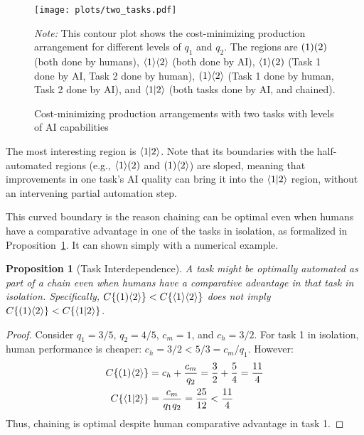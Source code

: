 \documentclass{article}
\theoremstyle{plain}
\theoremstyle{plain}
\newtheorem{proposition}[theorem]{Proposition}
\begin{document}
\begin{figure}
  \caption{Cost-minimizing production arrangements with two tasks with levels of AI capabilities} \label{fig:two_tasks}
  \begin{center}
  \texttt{[image: plots/two\_tasks.pdf]} \\
  \end{center}
\begin{footnotesize}
  \emph{Note:} This contour plot shows the cost-minimizing production arrangement for different levels of $q_1$ and $q_2$.
  The regions are $( 1 )( 2 )$ (both done by humans), $\langle 1 \rangle\langle 2 \rangle$ (both done by AI), $\langle 1 \rangle( 2 )$ (Task 1 done by AI, Task 2 done by human), $( 1 )\langle 2 \rangle$ (Task 1 done by human, Task 2 done by AI), and $\langle 1|2 \rangle$ (both tasks done by AI, and chained).
\end{footnotesize}
\end{figure}

The most interesting region is $\langle 1|2 \rangle$.
Note that its boundaries with the half-automated regions (e.g., $\langle 1 \rangle( 2 )$ and $( 1 )\langle 2 \rangle$) are sloped, meaning that improvements in one task's AI quality can bring it into the $\langle 1|2 \rangle$ region, without an intervening partial automation step.

This curved boundary is the reason chaining can be optimal even when humans have a comparative advantage in one of the tasks in isolation, as formalized in Proposition~\ref{proposition:interdependence}.
It can shown simply with a numerical example.

\begin{proposition}[Task Interdependence] \label{proposition:interdependence}
A task might be optimally automated as part of a chain even when humans have a comparative advantage in that task in isolation.
Specifically, $C\{ ( 1 )\langle 2 \rangle \} < C\{ \langle 1 \rangle\langle 2 \rangle \}$ does not imply $C\{ ( 1 )\langle 2 \rangle \} < C\{ \langle 1|2 \rangle \}$.
\end{proposition}
\begin{proof}
Consider $q_1 = 3/5$, $q_2 = 4/5$, $c_m = 1$, and $c_h = 3/2$.
For task 1 in isolation, human performance is cheaper: $c_h = 3/2 < 5/3 = c_m/q_1$.
However:
\begin{align*}
    C\{ ( 1 )\langle 2 \rangle \} &= c_h + \frac{c_m}{q_2} = \frac{3}{2} + \frac{5}{4} = \frac{11}{4} \\
    C\{ \langle 1|2 \rangle \} &= \frac{c_m}{q_1q_2} = \frac{25}{12} < \frac{11}{4}
\end{align*}
Thus, chaining is optimal despite human comparative advantage in task 1.
\end{proof}
\end{document}
